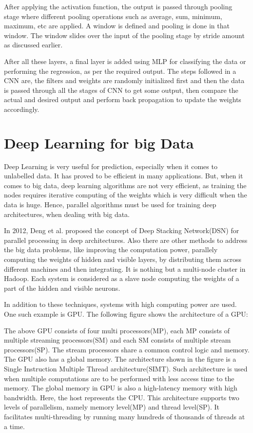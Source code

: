\documentclass[sigconf]{acmart}
\begin{document}
After applying the activation function, the output is passed through pooling stage where different pooling operations such as average, sum, minimum, maximum, etc are applied. A window is defined and pooling is done in that window. The window slides over the input of the pooling stage by stride amount as discussed earlier.

After all these layers, a final layer is added using MLP for classifying the data or performing the regression, as per the required output. The steps followed in a CNN are, the filters and weights are randomly initialized first and then the data is passed through all the stages of CNN to get some output, then compare the actual and desired output and perform back propagation to update the weights accordingly.
\section{Deep Learning for  big Data}
Deep Learning is very useful for prediction, especially when it comes to unlabelled data. It has proved to be efficient in many applications. But, when it comes to big data, deep learning algorithms are not very efficient, as training the nodes requires iterative computing of the weights which is very difficult when the data is huge. Hence, parallel algorithms must be used for training deep architectures, when dealing with big data.

In 2012, Deng et al.\cite{Deng2012} proposed the concept of Deep Stacking Network(DSN) for parallel processing in deep architectures. Also there are other methods to address the big data problems, like improving the computation power, parallely computing the weights of hidden and visible layers, by distributing them across different machines and then integrating. It is nothing but a multi-node cluster in Hadoop. Each system is considered as a slave node computing the weights of a part of the hidden and visible neurons.

In addition to these techniques, systems with high computing power are used. One such example is GPU. The following figure shows the architecture of a GPU:


The above GPU consists of four multi processors(MP), each MP consists of multiple streaming processors(SM) and each SM consists of multiple stream processors(SP). The stream processors share a common control logic and memory. The GPU also has a global memory. The architecture shown in the figure is a Single Instruction Multiple Thread architecture(SIMT). Such architecture is used when multiple computations are to be performed with less access time to the memory. The global memory in GPU is also a high-latency memory with high bandwidth. Here, the host represents the CPU. This architecture supports two levels of parallelism, namely memory level(MP) and thread level(SP). It facilitates multi-threading by running many hundreds of thousands of threads at a time.
\end{document}
